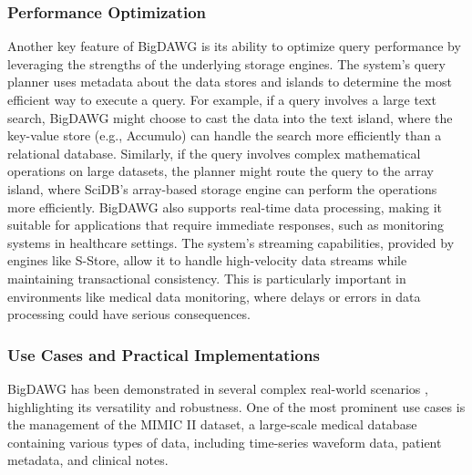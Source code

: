 \subsubsection{Performance Optimization}
Another key feature of \ac{BigDAWG} is its ability to optimize query performance \cite{DBLP:conf/hpec/SheRD16} by leveraging the strengths of the underlying storage engines. The system's query planner uses metadata about the data stores and islands to determine the most efficient way to execute a query. For example, if a query involves a large text search, \ac{BigDAWG} might choose to cast the data into the text island, where the key-value store (e.g., Accumulo) can handle the search more efficiently than a relational database. Similarly, if the query involves complex mathematical operations on large datasets, the planner might route the query to the array island, where SciDB's array-based storage engine can perform the operations more efficiently.
\ac{BigDAWG} also supports real-time data processing, making it suitable for applications that require immediate responses, such as monitoring systems in healthcare settings. The system's streaming capabilities, provided by engines like S-Store, allow it to handle high-velocity data streams while maintaining transactional consistency. This is particularly important in environments like medical data monitoring, where delays or errors in data processing could have serious consequences.
\subsubsection{Use Cases and Practical Implementations}
\ac{BigDAWG} has been demonstrated in several complex real-world scenarios \cite{DBLP:journals/pvldb/ElmoreDSBCGHHKK15} \cite{DBLP:conf/vldb/Mucklo18}, highlighting its versatility and robustness. One of the most prominent use cases is the management of the MIMIC II dataset, a large-scale medical database containing various types of data, including time-series waveform data, patient metadata, and clinical notes.
